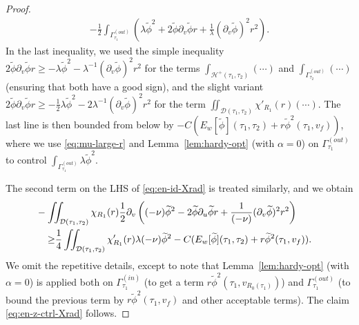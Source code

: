 \documentclass[10pt, reqno]{amsart}
\theoremstyle{definition}
\theoremstyle{remark}
\theoremstyle{conjecture}
\numberwithin{equation}{section}
\newcommand{\rd}{\partial}
\newcommand{\0}{\emptyset}
\newcommand{\alp}{\alpha}
\newcommand{\Gmm}{\Gamma}
\newcommand{\lmb}{\lambda}
\newcommand{\calD}{\mathcal D}
\newcommand{\calH}{\mathcal H}
\newcommand{\dur}{\nu}
\newcommand{\dvr}{\lmb}
\newcommand{\f}{\frac}
\newcommand{\EH}{\calH^{+}}
\newcommand{\phibg}{\overline{\phi}}				%
\newcommand{\phidf}{\widetilde{\phi}}				%
\begin{document}
\begin{proof}
\begin{align*}
	- \f 12 \int_{\Gmm_{\tau_{1}}^{(out)}} \left( \dvr \phidf^{2} + 2 \phidf \rd_{v} \phidf r + \frac{1}{\dvr} (\rd_{v} \phidf)^{2} r^{2} \right).
\end{align*}
In the last inequality, we used the simple inequality $2 \phidf \rd_{v} \phidf r \geq - \dvr \phidf^{2} - \dvr^{-1} (\rd_{v} \phidf)^{2} r^{2}$ for the terms $\int_{\EH(\tau_{1}, \tau_{2})}(\cdots)$ and $\int_{\Gmm^{(out)}_{\tau_{2}}}(\cdots)$ (ensuring that both have a good sign), and the slight variant  $2 \phidf \rd_{v} \phidf r \geq - \frac{1}{2} \dvr \phidf^{2} - 2 \dvr^{-1} (\rd_{v} \phidf)^{2} r^{2}$ for the term $\iint_{\calD(\tau_{1}, \tau_{2})} \chi'_{R_{1}}(r) (\cdots)$. The last line is then bounded from below by $- C (E_{w}[\phidf](\tau_{1}, \tau_{2}) + r \phidf^{2}(\tau_{1}, v_{f}))$, where we use \eqref{eq:mu-large-r} and Lemma~\ref{lem:hardy-opt} (with $\alp = 0$) on $\Gmm^{(out)}_{\tau_{1}}$ to control $\int_{\Gmm^{(out)}_{\tau_{1}}} \dvr \phidf^{2}$.

The second term on the LHS of \eqref{eq:en-id-Xrad} is treated similarly, and we obtain
\begin{align*}
& \hskip-2em
	- \iint_{\calD(\tau_{1}, \tau_{2})} \chi_{R_{1}}(r)  \frac{1}{2} \rd_{v} \left( (-\dur) \phidf^{2} - 2 \phidf \rd_{u} \phidf r + \frac{1}{(-\dur)} (\rd_{v} \phidf)^{2} r^{2} \right)  \\
	\geq & \frac{1}{4} \iint_{\calD(\tau_{1}, \tau_{2})} \chi'_{R_{1}}(r) \dvr (-\dur) \phidf^{2}  
		- C (E_{w}[\phidf](\tau_{1}, \tau_{2}) + r \phidf^{2}(\tau_{1}, v_{f})).
\end{align*}
We omit the repetitive details, except to note that Lemma~\ref{lem:hardy-opt} (with $\alp = 0$) is applied both on $\Gmm^{(in)}_{\tau_{1}}$ (to get a term $r \phidf^{2}(\tau_1, v_{R_{0}(\tau_{1})})$) and $\Gmm^{(out)}_{\tau_{1}}$ (to bound the previous term by $r \phidf^{2}(\tau_1,v_f)$ and other acceptable terms). The claim \eqref{eq:en-z-ctrl-Xrad} follows.


\end{proof}
\end{document}
